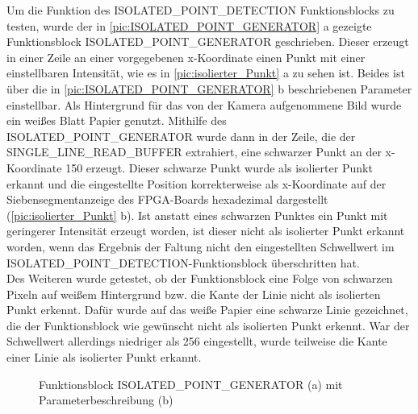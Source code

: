 \documentclass[ngerman,12pt]{article} %
\begin{document}
{Um die Funktion des ISOLATED\_POINT\_DETECTION Funktionsblocks zu testen, wurde der in \autoref{pic:ISOLATED_POINT_GENERATOR} a gezeigte Funktionsblock ISOLATED\_POINT\_GENERATOR geschrieben. Dieser erzeugt in einer Zeile an einer vorgegebenen x-Koordinate einen Punkt mit einer einstellbaren Intensität, wie es in \autoref{pic:isolierter_Punkt} a zu sehen ist. Beides ist über die in \autoref{pic:ISOLATED_POINT_GENERATOR} b beschriebenen Parameter einstellbar. Als Hintergrund für das von der Kamera aufgenommene Bild wurde ein weißes Blatt Papier genutzt. Mithilfe des ISOLATED\_POINT\_GENERATOR wurde dann in der Zeile, die der SINGLE\_LINE\_READ\_BUFFER extrahiert, eine schwarzer Punkt an der x-Koordinate 150 erzeugt. Dieser schwarze Punkt wurde als isolierter Punkt erkannt und die eingestellte Position korrekterweise als x-Koordinate auf der Siebensegmentanzeige des FPGA-Boards hexadezimal dargestellt (\autoref{pic:isolierter_Punkt} b). Ist anstatt eines schwarzen Punktes ein Punkt mit geringerer Intensität erzeugt worden, ist dieser nicht als isolierter Punkt erkannt worden, wenn das Ergebnis der Faltung nicht den eingestellten Schwellwert im ISOLATED\_POINT\_DETECTION-Funktionsblock überschritten hat.\\
Des Weiteren wurde getestet, ob der Funktionsblock eine Folge von schwarzen Pixeln auf weißem Hintergrund bzw. die Kante der Linie nicht als isolierten Punkt erkennt. Dafür wurde auf das weiße Papier eine schwarze Linie gezeichnet, die der Funktionsblock wie gewünscht nicht als isolierten Punkt erkennt. War der Schwellwert allerdings niedriger als 256 eingestellt, wurde teilweise die Kante einer Linie als isolierter Punkt erkannt.

\begin{figure}[h!tb]
  \centering
  \qquad
  \caption[Funktionsblock ISOLATED\_POINT\_GENERATOR mit Parameterbeschreibung]{\label{pic:ISOLATED_POINT_GENERATOR}Funktionsblock ISOLATED\_POINT\_GENERATOR (a) mit Parameterbeschreibung (b)}
\end{figure}



}
\end{document}
